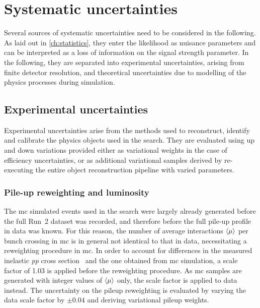 

\chapter{Systematic uncertainties}\label{ch:uncertainties}

\ifpdf
    \graphicspath{{chapter-uncertainties/Figs/Raster/}{chapter-uncertainties/Figs/PDF/}{chapter-uncertainties/Figs/}}
\else
    \graphicspath{{chapter-uncertainties/Figs/Vector/}{chapter-uncertainties/Figs/}}
\fi

Several sources of systematic uncertainties need to be considered in the following. As laid out in \cref{ch:statistics}, they enter the likelihood as nuisance parameters and can be interpreted as a loss of information on the signal strength parameter. In the following, they are separated into experimental uncertainties, arising \eg from finite detector resolution, and theoretical uncertainties due to modelling of the physics processes during simulation. 

\section{Experimental uncertainties}

Experimental uncertainties arise from the methods used to reconstruct, identify and calibrate the physics objects used in the \onelepton search. They are evaluated using up and down variations provided either as variational weights in the case of efficiency uncertainties, or as additional variational samples derived by re-executing the entire object reconstruction pipeline with varied parameters.

\subsection{Pile-up reweighting and luminosity}

The \gls{mc} simulated events used in the \onelepton search were largely already generated before the full Run~2 dataset was recorded, and therefore before the full pile-up profile in data was known. For this reason, the number of average interactions $\braket{\mu}$ per bunch crossing in \gls{mc} is in general not identical to that in data, necessitating a reweighting procedure in \gls{mc}. In order to account for differences in the measured inelastic \textit{pp} cross section~\cite{STDM-2015-05} and the one obtained from \gls{mc} simulation, a scale factor of 1.03 is applied before the reweighting procedure. As \gls{mc} samples are generated with integer values of $\braket{\mu}$ only, the scale factor is applied to data instead. The uncertainty on the pileup reweighting is evaluated by varying the data scale factor by $\pm 0.04$ and deriving variational pileup weights.

